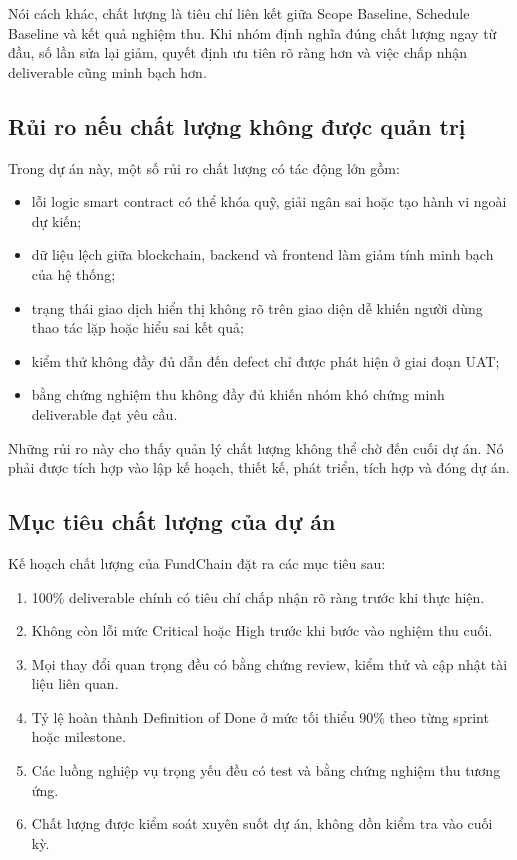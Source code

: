 Nói cách khác, chất lượng là tiêu chí liên kết giữa Scope Baseline, Schedule Baseline và kết quả nghiệm thu. Khi nhóm định nghĩa đúng chất lượng ngay từ đầu, số lần sửa lại giảm, quyết định ưu tiên rõ ràng hơn và việc chấp nhận deliverable cũng minh bạch hơn.

\subsection{Rủi ro nếu chất lượng không được quản trị}

Trong dự án này, một số rủi ro chất lượng có tác động lớn gồm:

\begin{itemize}
  \item lỗi logic smart contract có thể khóa quỹ, giải ngân sai hoặc tạo hành vi ngoài dự kiến;
  \item dữ liệu lệch giữa blockchain, backend và frontend làm giảm tính minh bạch của hệ thống;
  \item trạng thái giao dịch hiển thị không rõ trên giao diện dễ khiến người dùng thao tác lặp hoặc hiểu sai kết quả;
  \item kiểm thử không đầy đủ dẫn đến defect chỉ được phát hiện ở giai đoạn UAT;
  \item bằng chứng nghiệm thu không đầy đủ khiến nhóm khó chứng minh deliverable đạt yêu cầu.
\end{itemize}

Những rủi ro này cho thấy quản lý chất lượng không thể chờ đến cuối dự án. Nó phải được tích hợp vào lập kế hoạch, thiết kế, phát triển, tích hợp và đóng dự án.

\subsection{Mục tiêu chất lượng của dự án}

Kế hoạch chất lượng của FundChain đặt ra các mục tiêu sau:

\begin{enumerate}
  \item 100\% deliverable chính có tiêu chí chấp nhận rõ ràng trước khi thực hiện.
  \item Không còn lỗi mức Critical hoặc High trước khi bước vào nghiệm thu cuối.
  \item Mọi thay đổi quan trọng đều có bằng chứng review, kiểm thử và cập nhật tài liệu liên quan.
  \item Tỷ lệ hoàn thành Definition of Done ở mức tối thiểu 90\% theo từng sprint hoặc milestone.
  \item Các luồng nghiệp vụ trọng yếu đều có test và bằng chứng nghiệm thu tương ứng.
  \item Chất lượng được kiểm soát xuyên suốt dự án, không dồn kiểm tra vào cuối kỳ.
\end{enumerate}

